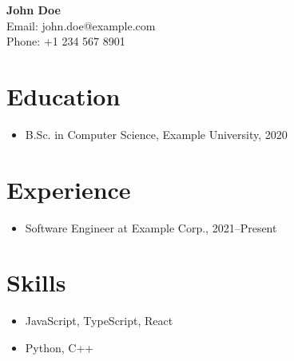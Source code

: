 \documentclass{article}
\begin{document}
\begin{center}
    {\LARGE \textbf{John Doe}}\\
    Email: john.doe@example.com \\ Phone: +1 234 567 8901
\end{center}

\section*{Education}
\begin{itemize}
    \item B.Sc. in Computer Science, Example University, 2020
\end{itemize}

\section*{Experience}
\begin{itemize}
    \item Software Engineer at Example Corp., 2021--Present
\end{itemize}

\section*{Skills}
\begin{itemize}
    \item JavaScript, TypeScript, React
    \item Python, C++
\end{itemize}
\end{document}
